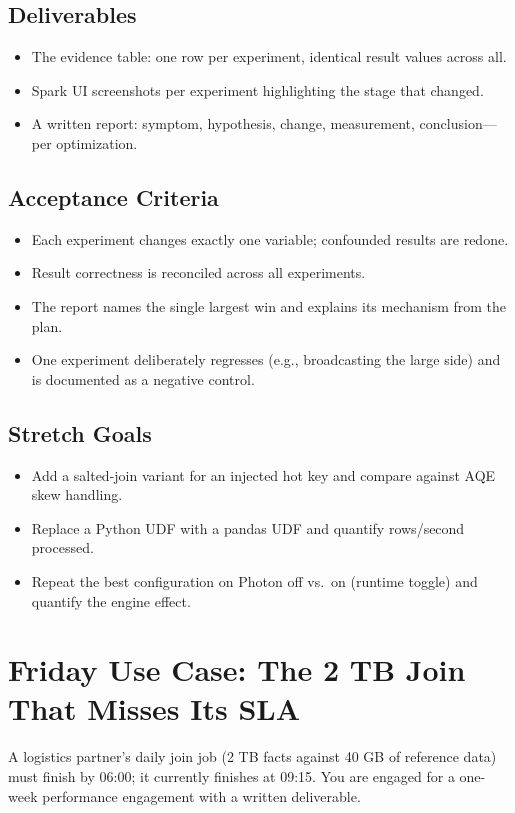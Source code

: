 \subsection*{Deliverables}
\begin{itemize}
    \item The evidence table: one row per experiment, identical result values across all.
    \item Spark UI screenshots per experiment highlighting the stage that changed.
    \item A written report: symptom, hypothesis, change, measurement, conclusion---per optimization.
\end{itemize}

\subsection*{Acceptance Criteria}
\begin{itemize}
    \item Each experiment changes exactly one variable; confounded results are redone.
    \item Result correctness is reconciled across all experiments.
    \item The report names the single largest win and explains its mechanism from the plan.
    \item One experiment deliberately regresses (e.g., broadcasting the large side) and is documented as a negative control.
\end{itemize}

\subsection*{Stretch Goals}
\begin{itemize}
    \item Add a salted-join variant for an injected hot key and compare against AQE skew handling.
    \item Replace a Python UDF with a pandas UDF and quantify rows/second processed.
    \item Repeat the best configuration on Photon off vs.\ on (runtime toggle) and quantify the engine effect.
\end{itemize}

\section{Friday Use Case: The 2 TB Join That Misses Its SLA}
A logistics partner's daily join job (2 TB facts against 40 GB of reference data) must finish by 06:00; it currently finishes at 09:15. You are engaged for a one-week performance engagement with a written deliverable.

